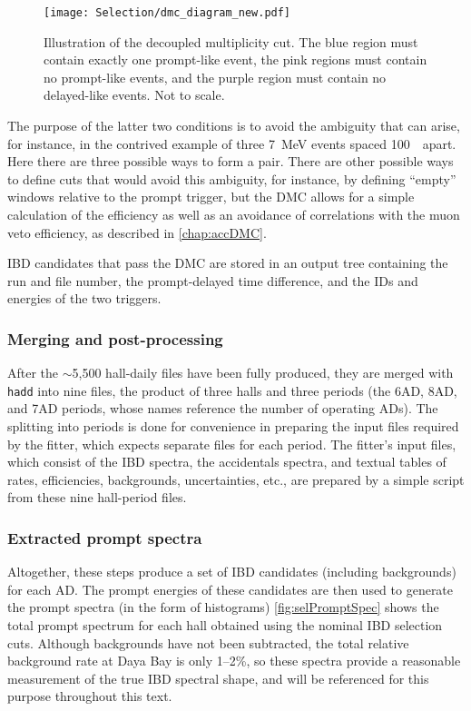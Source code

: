 \documentclass[../thesis.tex]{subfiles}
\begin{document}
\begin{figure}[h]
  \texttt{[image: Selection/dmc\_diagram\_new.pdf]}
  \caption{Illustration of the decoupled multiplicity cut. The blue region must contain exactly one prompt-like event, the pink regions must contain no prompt-like events, and the purple region must contain no delayed-like events. Not to scale.}
  \label{fig:dmc_diagram_rM}
\end{figure}

The purpose of the latter two conditions is to avoid the ambiguity that can arise, for instance, in the contrived example of three 7~MeV events spaced 100~\us\ apart. Here there are three possible ways to form a pair. There are other possible ways to define cuts that would avoid this ambiguity, for instance, by defining ``empty'' windows relative to the prompt trigger, but the DMC allows for a simple calculation of the efficiency as well as an avoidance of correlations with the muon veto efficiency, as described in \autoref{chap:accDMC}.

IBD candidates that pass the DMC are stored in an output tree containing the run and file number, the prompt-delayed time difference, and the IDs and energies of the two triggers.

\subsubsection{Merging and post-processing}
\label{sec:selMergingTwo}

After the $\sim$5,500 hall-daily files have been fully produced, they are merged with \texttt{hadd} into nine files, the product of three halls and three periods (the 6AD, 8AD, and 7AD periods, whose names reference the number of operating ADs). The splitting into periods is done for convenience in preparing the input files required by the fitter, which expects separate files for each period. The fitter's input files, which consist of the IBD spectra, the accidentals spectra, and textual tables of rates, efficiencies, backgrounds, uncertainties, etc., are prepared by a simple script from these nine hall-period files.

\subsubsection{Extracted prompt spectra}
\label{sec:selPromptSpec}

Altogether, these steps produce a set of IBD candidates (including backgrounds) for each AD. The prompt energies of these candidates are then used to generate the prompt spectra (in the form of histograms) \autoref{fig:selPromptSpec} shows the total prompt spectrum for each hall obtained using the nominal IBD selection cuts. Although backgrounds have not been subtracted, the total relative background rate at Daya Bay is only 1--2\%, so these spectra provide a reasonable measurement of the true IBD spectral shape, and will be referenced for this purpose throughout this text.
\end{document}
